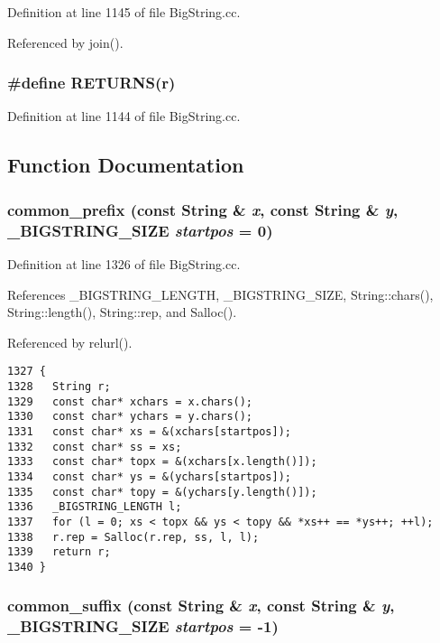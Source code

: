 Definition at line 1145 of file Big\-String.cc.

Referenced by join().
\subsubsection{\setlength{\rightskip}{0pt plus 5cm}\#define RETURNS(r)}\label{BigString_8cc_a4}




Definition at line 1144 of file Big\-String.cc.

\subsection{Function Documentation}
\subsubsection{ common\_\-prefix (const {\bf String} \& {\em x}, const {\bf String} \& {\em y}, {\bf \_\-BIGSTRING\_\-SIZE} {\em startpos} = 0)}\label{BigString_8cc_a40}




Definition at line 1326 of file Big\-String.cc.

References \_\-BIGSTRING\_\-LENGTH, \_\-BIGSTRING\_\-SIZE, String::chars(), String::length(), String::rep, and Salloc().

Referenced by relurl().



\footnotesize\begin{verbatim}1327 {
1328   String r;
1329   const char* xchars = x.chars();
1330   const char* ychars = y.chars();
1331   const char* xs = &(xchars[startpos]);
1332   const char* ss = xs;
1333   const char* topx = &(xchars[x.length()]);
1334   const char* ys = &(ychars[startpos]);
1335   const char* topy = &(ychars[y.length()]);
1336   _BIGSTRING_LENGTH l;
1337   for (l = 0; xs < topx && ys < topy && *xs++ == *ys++; ++l);
1338   r.rep = Salloc(r.rep, ss, l, l);
1339   return r;
1340 }
\end{verbatim}\normalsize 
{}
\subsubsection{ common\_\-suffix (const {\bf String} \& {\em x}, const {\bf String} \& {\em y}, {\bf \_\-BIGSTRING\_\-SIZE} {\em startpos} = -1)}\label{BigString_8cc_a41}




